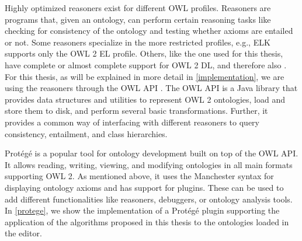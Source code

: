 Highly optimized reasoners exist for different OWL profiles. Reasoners are programs that, given an ontology, can perform certain reasoning tasks like checking for consistency of the ontology and testing whether axioms are entailed or not. Some reasoners specialize in the more restricted profiles, e.g., ELK \cite{kazakov2014elk} supports only the OWL 2 EL profile. Others, like the one used for this thesis, have complete or almost complete support for OWL 2 DL, and therefore also \SROIQ. For this thesis, as will be explained in more detail in \cref{implementation}, we are using the reasoners through the OWL API \cite{horridge2011owl}. The OWL API is a Java library that provides data structures and utilities to represent OWL 2 ontologies, load and store them to disk, and perform several basic transformations. Further, it provides a common way of interfacing with different reasoners to query consistency, entailment, and class hierarchies.

Protégé \cite{musen2015protege} is a popular tool for ontology development built on top of the OWL API. It allows reading, writing, viewing, and modifying ontologies in all main formats supporting OWL 2. As mentioned above, it uses the Manchester syntax for displaying ontology axioms and has support for plugins. These can be used to add different functionalities like reasoners, debuggers, or ontology analysis tools. In \cref{protege}, we show the implementation of a Protégé plugin supporting the application of the algorithms proposed in this thesis to the ontologies loaded in the editor.

